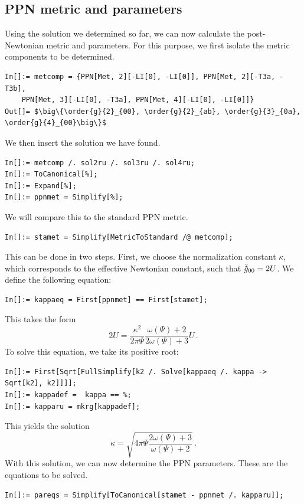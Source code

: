 \documentclass[notitlepage,a4paper,aps,prd,onecolumn,superscriptaddress,nofootinbib,groupedaddress,longbibliography]{revtex4-1}
\newcommand{\order}[2]{\accentset{#2}{#1}}
\begin{document}
\subsection{PPN metric and parameters}\label{ssec:ppnmetric}
Using the solution we determined so far, we can now calculate the post-Newtonian metric and parameters. For this purpose, we first isolate the metric components to be determined.
\begin{lstlisting}
In[]:= metcomp = {PPN[Met, 2][-LI[0], -LI[0]], PPN[Met, 2][-T3a, -T3b],
	PPN[Met, 3][-LI[0], -T3a], PPN[Met, 4][-LI[0], -LI[0]]}
Out[]= $\big\{\order{g}{2}_{00}, \order{g}{2}_{ab}, \order{g}{3}_{0a}, \order{g}{4}_{00}\big\}$
\end{lstlisting}
We then insert the solution we have found.
\begin{lstlisting}
In[]:= metcomp /. sol2ru /. sol3ru /. sol4ru;
In[]:= ToCanonical[%];
In[]:= Expand[%];
In[]:= ppnmet = Simplify[%];
\end{lstlisting}
We will compare this to the standard PPN metric.
\begin{lstlisting}
In[]:= stamet = Simplify[MetricToStandard /@ metcomp];
\end{lstlisting}
This can be done in two steps. First, we choose the normalization constant \(\kappa\), which corresponds to the effective Newtonian constant, such that \(\order{g}{2}_{00} = 2U\). We define the following equation:
\begin{lstlisting}
In[]:= kappaeq = First[ppnmet] == First[stamet];
\end{lstlisting}
This takes the form
\begin{equation}
2U = \frac{\kappa^2}{2\pi\Psi}\frac{\omega(\Psi) + 2}{2\omega(\Psi) + 3}U\,.
\end{equation}
To solve this equation, we take its positive root:
\begin{lstlisting}
In[]:= First[Sqrt[FullSimplify[k2 /. Solve[kappaeq /. kappa -> Sqrt[k2], k2]]]];
In[]:= kappadef =  kappa == %;
In[]:= kapparu = mkrg[kappadef];
\end{lstlisting}
This yields the solution
\begin{equation}
\kappa = \sqrt{4\pi\Psi\frac{2\omega(\Psi) + 3}{\omega(\Psi) + 2}}\,.
\end{equation}
With this solution, we can now determine the PPN parameters. These are the equations to be solved.
\begin{lstlisting}
In[]:= pareqs = Simplify[ToCanonical[stamet - ppnmet /. kapparu]];
\end{lstlisting}
\end{document}
